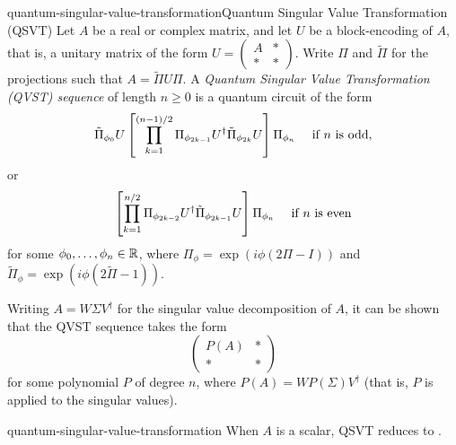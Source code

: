 \begin{topic}{quantum-singular-value-transformation}{Quantum Singular Value Transformation (QSVT)}
    Let $A$ be a real or complex matrix, and let $U$ be a block-encoding of $A$, that is, a unitary matrix of the form $U = \begin{pmatrix} A & * \\ * & * \end{pmatrix}$. Write $\Pi$ and $\tilde{\Pi}$ for the projections such that $A = \tilde{\Pi} U \Pi$.
    A \emph{Quantum Singular Value Transformation (QVST) sequence} of length $n \ge 0$ is a quantum circuit of the form
    \[ \tilde{\Pi}_{\phi_0} U \left[ \prod_{k = 1}^{(n - 1) / 2} \Pi_{\phi_{2k - 1}} U^\dagger \tilde{\Pi}_{\phi_{2k}} U \right] \Pi_{\phi_n} \quad \textup{ if $n$ is odd}, \]
    or
    \[ \left[ \prod_{k = 1}^{n / 2} \Pi_{\phi_{2k - 2}} U^\dagger \tilde{\Pi}_{\phi_{2k - 1}} U \right] \Pi_{\phi_n} \quad \textup{ if $n$ is even} \]
    for some $\phi_0, \ldots, \phi_n \in \mathbb{R}$, where $\Pi_\phi = \exp(i \phi (2 \Pi - I))$ and $\tilde{\Pi}_\phi = \exp(i \phi (2 \tilde{\Pi} - 1))$.

    Writing $A = W \Sigma V^\dagger$ for the singular value decomposition of $A$, it can be shown that the QVST sequence takes the form
    \[ \begin{pmatrix} P(A) & * \\ * & * \end{pmatrix} \]
    for some polynomial $P$ of degree $n$, where $P(A) = W P(\Sigma) V^\dagger$ (that is, $P$ is applied to the singular values).
\end{topic}

\begin{example}{quantum-singular-value-transformation}
    When $A$ is a scalar, QSVT reduces to .
\end{example}

